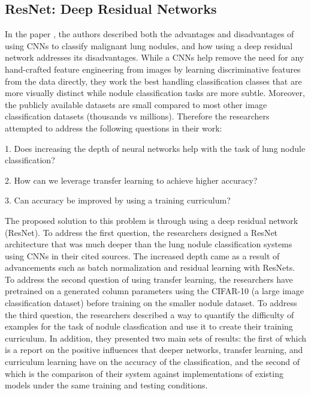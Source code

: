 \documentclass[10pt,twocolumn,letterpaper]{article}
\begin{document}
   \subsection{ResNet: Deep Residual Networks} \label{sec:related-deep-residual-networks}
      In the paper \cite{deep_residual_network}, the authors described both the advantages and disadvantages of using
      CNNs to classify malignant lung nodules, and how using a deep residual network addresses its disadvantages.
      While a CNNs help remove the need for any hand-crafted feature engineering from images by learning discriminative
      features from the data directly, they work the best handling classification classes that are more visually distinct
      while nodule classification tasks are more subtle. Moreover, the publicly available datasets are small compared to
      most other image classification datasets (thousands vs millions). Therefore the researchers attempted to address
      the following questions in their work:

      1. Does increasing the depth of neural networks help with the task of lung nodule classification?

      2. How can we leverage transfer learning to achieve higher accuracy?

      3. Can accuracy be improved by using a training curriculum?

      The proposed solution to this problem is through using a deep residual network (ResNet). To address the first question,
      the researchers designed a ResNet architecture that was much deeper than the lung nodule classification systems
      using CNNs in their cited sources. The increased depth came as a result of advancements such as batch normalization
      and residual learning with ResNets. To address the second question of using transfer learning, the researchers
      have pretrained on a generated column parameters using the CIFAR-10 (a large image classification dataset) before
      training on the smaller nodule dataset. To address the third question, the researchers described a way to quantify the
      difficulty of examples for the task of nodule classfication and use it to create their training curriculum. In addition,
      they presented two main sets of results: the first of which is a report on the positive influences that deeper networks, transfer learning, and curriculum
      learning have on the accuracy of the classification, and the second of which is the comparison of their system
      against implementations of existing models under the same training and testing conditions.
\end{document}
